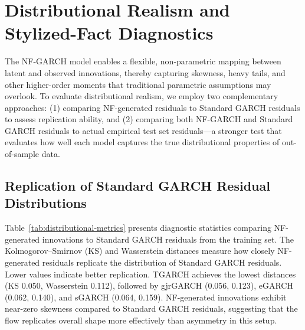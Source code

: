 \documentclass[oneside,12pt]{CUEDthesisPSnPDF}
\begin{document}
\section{Distributional Realism and Stylized-Fact Diagnostics}
\label{sec:dist_realism}
\noindent
The NF-GARCH model enables a flexible, non-parametric mapping between latent and observed innovations, thereby capturing skewness, heavy tails, and other higher-order moments that traditional parametric assumptions may overlook. To evaluate distributional realism, we employ two complementary approaches: (1) comparing NF-generated residuals to Standard GARCH residuals to assess replication ability, and (2) comparing both NF-GARCH and Standard GARCH residuals to actual empirical test set residuals---a stronger test that evaluates how well each model captures the true distributional properties of out-of-sample data.\\

\subsection{Replication of Standard GARCH Residual Distributions}
\label{subsec:replication}

Table~\ref{tab:distributional-metrics} presents diagnostic statistics comparing NF-generated innovations to Standard GARCH residuals from the training set. The Kolmogorov--Smirnov (KS) and Wasserstein distances measure how closely NF-generated residuals replicate the distribution of Standard GARCH residuals. Lower values indicate better replication. TGARCH achieves the lowest distances (KS 0.050, Wasserstein 0.112), followed by gjrGARCH (0.056, 0.123), eGARCH (0.062, 0.140), and sGARCH (0.064, 0.159). NF-generated innovations exhibit near-zero skewness compared to Standard GARCH residuals, suggesting that the flow replicates overall shape more effectively than asymmetry in this setup.\\
\end{document}
